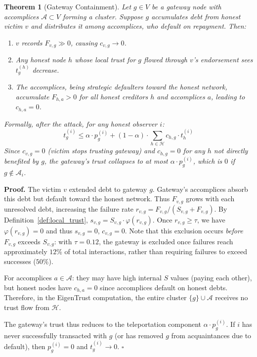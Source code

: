 \documentclass[11pt]{article}
\newtheorem{theorem}{Theorem}[section]
\newcommand{\qed}{\hfill}
\newenvironment{proof}{\noindent\textbf{Proof.}}{\qed$\square$\par\medskip}
\begin{document}
\begin{theorem}[Gateway Containment]\label{thm:gateway}
Let $g \in V$ be a gateway node with accomplices $\mathcal{A} \subset V$ forming a cluster. Suppose $g$ accumulates debt from honest victim $v$ and distributes it among accomplices, who default on repayment. Then:
\begin{enumerate}
    \item $v$ records $F_{v,g} \gg 0$, causing $c_{v,g} \to 0$.
    \item Any honest node $h$ whose local trust for $g$ flowed through $v$'s endorsement sees $t^{(h)}_g$ decrease.
    \item The accomplices, being strategic defaulters toward the honest network, accumulate $F_{h,a} > 0$ for all honest creditors $h$ and accomplices $a$, leading to $c_{h,a} = 0$.
\end{enumerate}
Formally, after the attack, for any honest observer $i$:
\begin{equation}
    t^{(i)}_g \leq \alpha \cdot p^{(i)}_g + (1-\alpha) \cdot \sum_{h \in \mathcal{H}} c_{h,g} \cdot t^{(i)}_h
\end{equation}
Since $c_{v,g} = 0$ (victim stops trusting gateway) and $c_{h,g} = 0$ for any $h$ not directly benefited by $g$, the gateway's trust collapses to at most $\alpha \cdot p^{(i)}_g$, which is $0$ if $g \notin \mathcal{A}_i$.
\end{theorem}

\begin{proof}
The victim $v$ extended debt to gateway $g$. Gateway's accomplices absorb this debt but default toward the honest network. Thus $F_{v,g}$ grows with each unresolved debt, increasing the failure rate $r_{v,g} = F_{v,g} / (S_{v,g} + F_{v,g})$. By Definition~\ref{def:local_trust}, $s_{v,g} = S_{v,g} \cdot \varphi(r_{v,g})$. Once $r_{v,g} \geq \tau$, we have $\varphi(r_{v,g}) = 0$ and thus $s_{v,g} = 0$, $c_{v,g} = 0$. Note that this exclusion occurs \emph{before} $F_{v,g}$ exceeds $S_{v,g}$: with $\tau = 0.12$, the gateway is excluded once failures reach approximately $12\%$ of total interactions, rather than requiring failures to exceed successes ($50\%$).

For accomplices $a \in \mathcal{A}$: they may have high internal $S$ values (paying each other), but honest nodes have $c_{h,a} = 0$ since accomplices default on honest debts. Therefore, in the EigenTrust computation, the entire cluster $\{g\} \cup \mathcal{A}$ receives no trust flow from $\mathcal{H}$.

The gateway's trust thus reduces to the teleportation component $\alpha \cdot p^{(i)}_g$. If $i$ has never successfully transacted with $g$ (or has removed $g$ from acquaintances due to default), then $p^{(i)}_g = 0$ and $t^{(i)}_g \to 0$. \qed
\end{proof}
\end{document}
